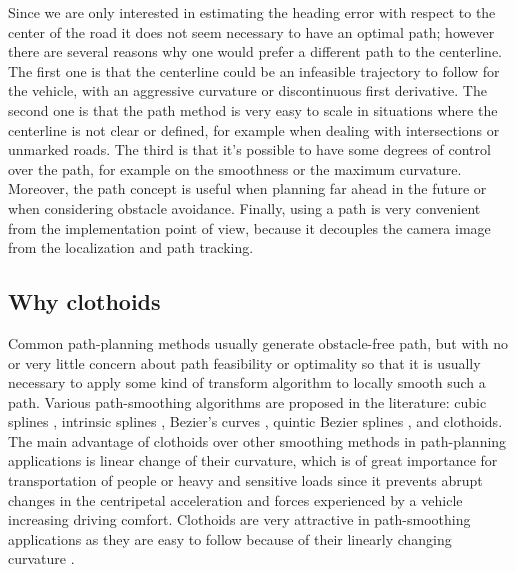 \documentclass[a4paper,12pt,sort&compress]{article}
\begin{document}
    Since we are only interested in estimating the heading error with respect to the center of the
    road it does not seem necessary to have an optimal path; however there are several reasons
    why one would prefer a different path to the centerline. The first one is that the centerline
    could be an infeasible trajectory to follow for the vehicle, with an aggressive curvature or
    discontinuous first derivative. The second one is that the path
    method is very easy to scale in situations where the centerline is not clear or defined, for
    example when dealing with intersections or unmarked roads. The third is that it's possible to
    have some degrees of control over the path, for example on the smoothness or the maximum
    curvature. Moreover, the path concept is useful when planning far ahead in the future or when
    considering obstacle avoidance. Finally, using a path is very convenient from the implementation point of
    view, because it decouples the camera image from the localization and path tracking.

    \subsection{Why clothoids}
    Common path-planning methods usually generate obstacle-free path, but with no or very little concern
    about path feasibility or optimality so that it is usually necessary to apply some kind of transform
    algorithm to locally smooth such a path. Various path-smoothing algorithms are proposed in the
    literature: cubic splines \citep*{kanayama1988smooth}, intrinsic splines
    \citep*{delingette1991trajectory}, Bezier's curves \citep*{segovia1991comparative}, quintic
    Bezier splines \citep*{lau2009kinodynamic}, and clothoids. The main advantage of clothoids over
    other smoothing methods in path-planning
    applications is linear change of their curvature, which is of great importance for transportation of
    people or heavy and sensitive loads since it prevents abrupt changes in the centripetal acceleration
    and forces experienced by a vehicle increasing driving comfort. Clothoids are very attractive in
    path-smoothing applications as they are easy to follow because of their linearly changing
    curvature \citep*{shanmugavel2010co}. 
\end{document}
